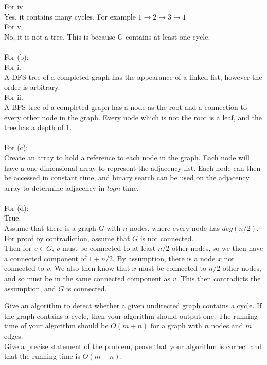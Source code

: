 \documentclass{assignment}
\begin{document}
\begin{problemlist}
\begin{answer}
For iv.\\
Yes, it contains many cycles. For example $1\rightarrow 2\rightarrow 3\rightarrow 1$\\
For v.\\
No, it is not a tree. This is because G contains at least one cycle.\\
\\
For (b):\\
For i.\\
A DFS tree of a completed graph has the appearance of a linked-list, however the order is arbitrary.\\
For ii.\\
A BFS tree of a completed graph has a node as the root and a connection to every other node in the graph. Every node which is not the root is a leaf, and the tree has a depth of 1.\\
\\For (c):\\
Create an array to hold a reference to each node in the graph. Each node will have a one-dimensional array to represent the adjacency list. Each node can then be accessed in constant time, and binary search can be used on the adjacency array to determine adjacency in $logn$ time.\\
\\
For (d):\\
True.\\
Assume that there is a graph $G$ with $n$ nodes, where every node has $deg(n/2)$.\\
For proof by contradiction, assume that $G$ is not connected.\\
Then for $v\in G$, $v$ must be connected to at least $n/2$ other nodes, so we then have a connected component of $1 + n/2$. By assumption, there is a node $x$ not connected to $v$. We also then know that $x$ must be connected to $n/2$ other nodes, and so must be in the same connected component as $v$. This then contradicts the assumption, and $G$ is connected.\\
\end{answer}
\clearpage
\pbitem
\begin{problem}
Give an algorithm to detect whether a given undirected graph contains a cycle. If the graph contains a cycle, then your algorithm should output one. The running time of your algorithm should be $O(m+n)$ for a graph with $n$ nodes and $m$ edges.\\
Give a precise statement of the problem, prove that your algorithm is correct and that the running time is $O(m+n)$.\\

\end{problem}
\end{problemlist}
\end{document}
